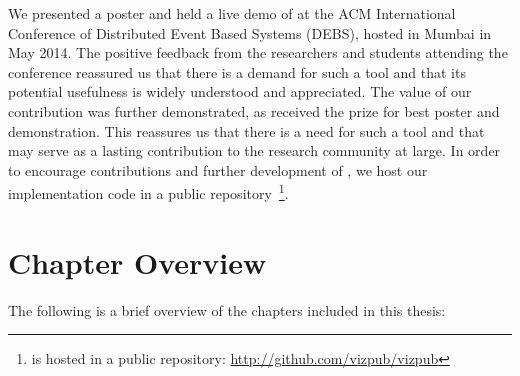 We presented a poster and held a live demo of \demo{} at the ACM
International Conference of Distributed Event Based Systems (DEBS),
hosted in Mumbai in May 2014. The positive feedback from the researchers and
students attending the conference reassured us that there is a
demand for such a tool and that its potential usefulness is widely
understood and appreciated. The value of our contribution was further
demonstrated, as \demo{} received the prize for best poster and
demonstration. This reassures us that there is a need for such a tool
and that \demo{} may serve as a lasting contribution to the research
community at large. In order to encourage contributions and further
development of \demo{}, we host our implementation code in a public
repository~\footnote{\demo{} is hosted in a public repository: \url{http://github.com/vizpub/vizpub}}.

\section{Chapter Overview}

The following is a brief overview of the chapters included in this
thesis:

